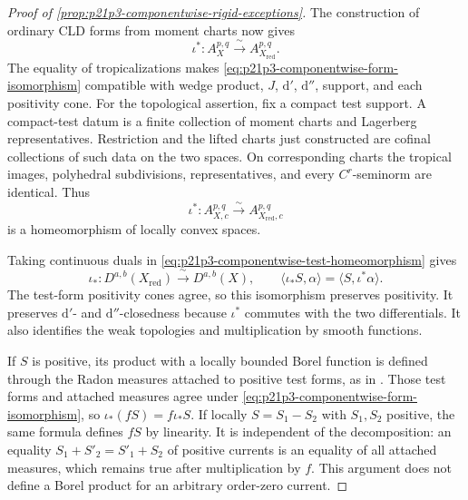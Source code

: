 \begin{proof}[Proof of
\cref{prop:p21p3-componentwise-rigid-exceptions}]
The construction of ordinary CLD forms from moment charts now gives
\begin{equation}
 \label{eq:p21p3-componentwise-form-isomorphism}
 \iota^*:A_X^{p,q}\xrightarrow{\ \sim\ }
                    A_{X_{\mathrm{red}}}^{p,q}.
\end{equation}
The equality of tropicalizations makes
\eqref{eq:p21p3-componentwise-form-isomorphism} compatible with wedge
product, $J$, $\mathrm d'$, $\mathrm d''$, support, and each positivity
cone.  For the topological assertion, fix a compact test support.  A
compact-test datum is a finite collection of moment charts and Lagerberg
representatives.  Restriction and the lifted charts just constructed are
cofinal collections of such data on the two spaces.  On corresponding
charts the tropical images, polyhedral subdivisions, representatives, and
every $C^r$-seminorm are identical.  Thus
\begin{equation}
 \label{eq:p21p3-componentwise-test-homeomorphism}
 \iota^*:A^{p,q}_{X,c}\xrightarrow{\ \sim\ }
                    A^{p,q}_{X_{\mathrm{red}},c}
\end{equation}
is a homeomorphism of locally convex spaces.

Taking continuous duals in
\eqref{eq:p21p3-componentwise-test-homeomorphism} gives
\begin{equation}
 \label{eq:p21p3-componentwise-current-isomorphism}
 \iota_*:D^{a,b}(X_{\mathrm{red}})
       \xrightarrow{\ \sim\ }D^{a,b}(X),
 \qquad
 \langle\iota_*S,\alpha\rangle
       =\langle S,\iota^*\alpha\rangle.
\end{equation}
The test-form positivity cones agree, so this isomorphism preserves
positivity.  It preserves $\mathrm d'$- and $\mathrm d''$-closedness because
$\iota^*$ commutes with the two differentials.  It also identifies the weak
topologies and multiplication by smooth functions.

If $S$ is positive, its product with a locally bounded Borel function is
defined through the Radon measures attached to positive test forms, as in
\cite[Example~7.2.12]{CLD25}.  Those test forms and attached measures agree
under \eqref{eq:p21p3-componentwise-form-isomorphism}, so
$\iota_*(fS)=f\iota_*S$.  If locally $S=S_1-S_2$ with $S_1,S_2$ positive,
the same formula defines $fS$ by linearity.  It is independent of the
decomposition: an equality
$S_1+S'_2=S'_1+S_2$ of positive currents is an equality of all attached
measures, which remains true after multiplication by $f$.  This argument
does not define a Borel product for an arbitrary order-zero current.


\end{proof}
